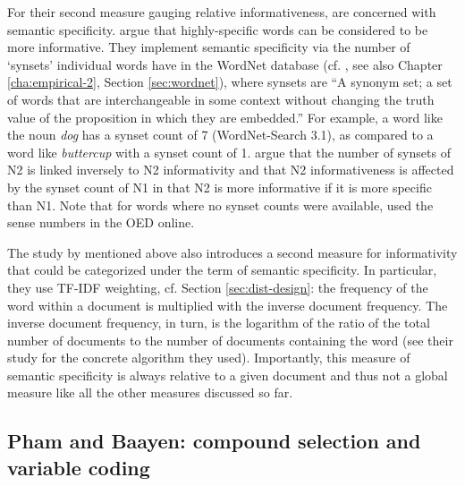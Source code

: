 For their second measure gauging relative informativeness, \citet[493]{BellandPlag:2012} are concerned with semantic specificity.
\citet{BellandPlag:2012} argue that highly-specific words can be considered to
be more informative. They implement semantic specificity via the number of
`synsets' individual words have in the WordNet database
(cf. \citealt{Fellbaum:1998}, see also Chapter \ref{cha:empirical-2}, Section \ref{sec:wordnet}), where synsets are ``A synonym set; a set of words
that are interchangeable in some context without changing the truth value of
the proposition in which they are embedded.'' %
For example, a word like the noun \emph{dog} has a synset count of 7
(WordNet-Search 3.1), as compared to a word like \emph{buttercup} with a
synset count of 1. 
 \citet{BellandPlag:2012} argue that the number of synsets
of N2 is linked inversely to N2 informativity and that N2 informativeness is
affected by the synset count of N1 in that N2 is more informative if it is
more specific than N1. 
Note that for words where no synset counts were available,
\citet{BellandPlag:2012} used the sense numbers in the OED online.

The study by \citet{PanandMcKeown:1999} mentioned above also
introduces a second measure for informativity that could be
categorized under the term of semantic specificity. In particular,
they use TF-IDF weighting, cf. Section \ref{sec:dist-design}: the frequency of
the word within a document is multiplied with the inverse document
frequency. The inverse document frequency, in turn, is the logarithm
of the ratio of the total number of documents to the number of
documents containing the word (see their study for the concrete
algorithm they used). Importantly, this measure of semantic
specificity is always relative to a given document and thus not a
global measure like all the other measures discussed so far.


 


\subsection{Pham and Baayen: compound selection and variable coding}
\label{sec:phambaayenbasic}

